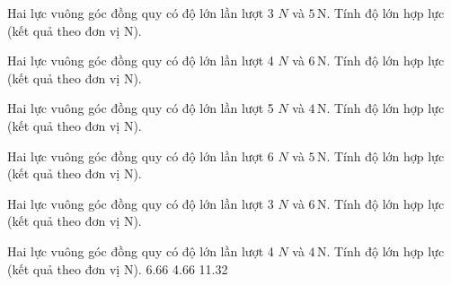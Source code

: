 \begin{bt}
Hai lực vuông góc đồng quy có độ lớn lần lượt 3 $N$ và $5\,\text{N}$. Tính độ lớn hợp lực (kết quả theo đơn vị N).
\end{bt}

\begin{bt}
Hai lực vuông góc đồng quy có độ lớn lần lượt 4 $N$ và $6\,\text{N}$. Tính độ lớn hợp lực (kết quả theo đơn vị N).
\end{bt}

\begin{bt}
Hai lực vuông góc đồng quy có độ lớn lần lượt 5 $N$ và $4\,\text{N}$. Tính độ lớn hợp lực (kết quả theo đơn vị N).
\end{bt}

\begin{bt}
Hai lực vuông góc đồng quy có độ lớn lần lượt 6 $N$ và $5\,\text{N}$. Tính độ lớn hợp lực (kết quả theo đơn vị N).
\end{bt}

\begin{bt}
Hai lực vuông góc đồng quy có độ lớn lần lượt 3 $N$ và $6\,\text{N}$. Tính độ lớn hợp lực (kết quả theo đơn vị N).
\end{bt}

\begin{ex}
Hai lực vuông góc đồng quy có độ lớn lần lượt 4 $N$ và $4\,\text{N}$. Tính độ lớn hợp lực (kết quả theo đơn vị N).
\choice
{}
{6.66}
{4.66}
{11.32}
\end{ex}

